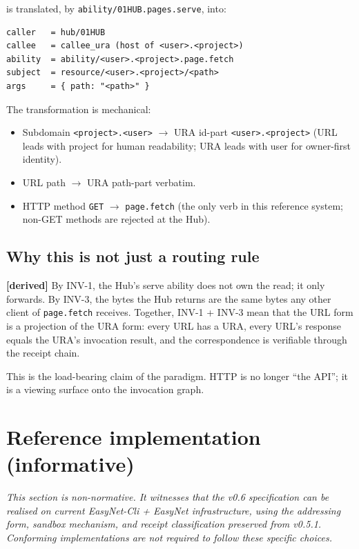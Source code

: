 \documentclass[11pt,a4paper]{article}
\newcommand{\derived}{\textcolor{derivedcolor}{\textbf{[derived]}}\xspace}
\theoremstyle{definition}
\begin{document}
is translated, by \texttt{ability/01HUB.pages.serve}, into:

\begin{lstlisting}
caller   = hub/01HUB
callee   = callee_ura (host of <user>.<project>)
ability  = ability/<user>.<project>.page.fetch
subject  = resource/<user>.<project>/<path>
args     = { path: "<path>" }
\end{lstlisting}

The transformation is mechanical:

\begin{itemize}[leftmargin=2em,itemsep=0.12em]
    \item Subdomain \texttt{<project>.<user>} \(\to\)
    URA id-part \texttt{<user>.<project>} (URL leads with
    project for human readability; URA leads with user for
    owner-first identity).
    \item URL path \(\to\) URA path-part verbatim.
    \item HTTP method \texttt{GET} \(\to\) \texttt{page.fetch}
    (the only verb in this reference system; non-GET methods
    are rejected at the Hub).
\end{itemize}

\subsection{Why this is not just a routing rule}

\derived{} By INV-1, the Hub's serve ability does not own the
read; it only forwards. By INV-3, the bytes the Hub returns
are the same bytes any other client of \texttt{page.fetch}
receives. Together, INV-1 + INV-3 mean that the URL form is a
projection of the URA form: every URL has a URA, every URL's
response equals the URA's invocation result, and the
correspondence is verifiable through the receipt chain.

This is the load-bearing claim of the paradigm. HTTP is no
longer ``the API''; it is a viewing surface onto the
invocation graph.

\section{Reference implementation (informative)}
\label{sec:ref-impl}

\textit{This section is non-normative. It witnesses that the
v0.6 specification can be realised on current EasyNet-Cli +
EasyNet infrastructure, using the addressing form, sandbox
mechanism, and receipt classification preserved from v0.5.1.
Conforming implementations are not required to follow these
specific choices.}
\end{document}
